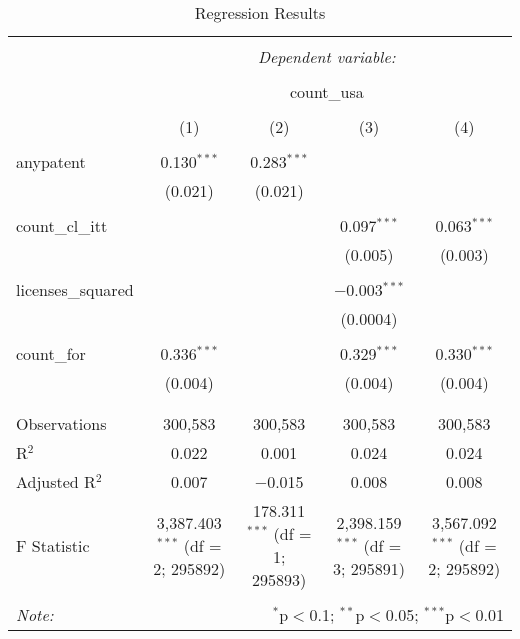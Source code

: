 
\begin{table}[!htbp] \centering 
  \caption{Regression Results} 
  \label{tab:regression_results} 
\begin{tabular}{@{\extracolsep{5pt}}lcccc} 
\\[-1.8ex]\hline 
\hline \\[-1.8ex] 
 & \multicolumn{4}{c}{\textit{Dependent variable:}} \\ 
\cline{2-5} 
\\[-1.8ex] & \multicolumn{4}{c}{count\_usa} \\ 
\\[-1.8ex] & (1) & (2) & (3) & (4)\\ 
\hline \\[-1.8ex] 
 anypatent & 0.130$^{***}$ & 0.283$^{***}$ &  &  \\ 
  & (0.021) & (0.021) &  &  \\ 
  & & & & \\ 
 count\_cl\_itt &  &  & 0.097$^{***}$ & 0.063$^{***}$ \\ 
  &  &  & (0.005) & (0.003) \\ 
  & & & & \\ 
 licenses\_squared &  &  & $-$0.003$^{***}$ &  \\ 
  &  &  & (0.0004) &  \\ 
  & & & & \\ 
 count\_for & 0.336$^{***}$ &  & 0.329$^{***}$ & 0.330$^{***}$ \\ 
  & (0.004) &  & (0.004) & (0.004) \\ 
  & & & & \\ 
\hline \\[-1.8ex] 
Observations & 300,583 & 300,583 & 300,583 & 300,583 \\ 
R$^{2}$ & 0.022 & 0.001 & 0.024 & 0.024 \\ 
Adjusted R$^{2}$ & 0.007 & $-$0.015 & 0.008 & 0.008 \\ 
F Statistic & 3,387.403$^{***}$ (df = 2; 295892) & 178.311$^{***}$ (df = 1; 295893) & 2,398.159$^{***}$ (df = 3; 295891) & 3,567.092$^{***}$ (df = 2; 295892) \\ 
\hline 
\hline \\[-1.8ex] 
\textit{Note:}  & \multicolumn{4}{r}{$^{*}$p$<$0.1; $^{**}$p$<$0.05; $^{***}$p$<$0.01} \\ 
\end{tabular} 
\end{table} 
